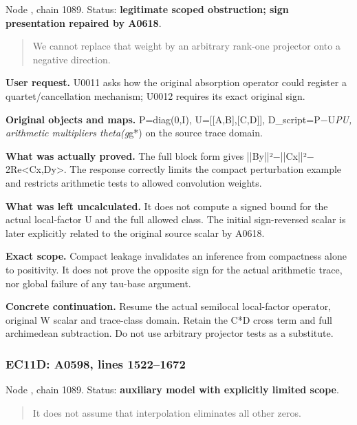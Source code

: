 \documentclass[10pt,a4paper,oneside]{report}
\begin{document}
Node \protect{}, chain 1089.
Status: \textbf{legitimate scoped obstruction; sign presentation
repaired by A0618}.

\begin{quote}
We cannot replace that weight by an arbitrary rank-one projector onto a
negative direction.
\end{quote}

\textbf{User request.} U0011 asks how the original absorption operator
could register a quartet/cancellation mechanism; U0012 requires its
exact original sign.

\textbf{Original objects and maps.} P=diag(0,I),
U={[}{[}A,B{]},{[}C,D{]}{]},
D\_script=P\allowbreak{}\ensuremath{−}\allowbreak{}U\emph{PU, arithmetic
multipliers theta(g}g*) on the source trace domain.

\textbf{What was actually proved.} The full block form gives
||By||²\allowbreak{}\ensuremath{−}\allowbreak{}||Cx||²\allowbreak{}\ensuremath{−}\allowbreak{}2Re<Cx,Dy>.
The response correctly limits the compact perturbation example and
restricts arithmetic tests to allowed convolution weights.

\textbf{What was left uncalculated.} It does not compute a signed bound
for the actual local-factor U and the full allowed class. The initial
sign-reversed scalar is later explicitly related to the original source
scalar by A0618.

\textbf{Exact scope.} Compact leakage invalidates an inference from
compactness alone to positivity. It does not prove the opposite sign for
the actual arithmetic trace, nor global failure of any tau-base
argument.

\textbf{Concrete continuation.} Resume the actual semilocal local-factor
operator, original W scalar and trace-class domain. Retain the C*D cross
term and full archimedean subtraction. Do not use arbitrary projector
tests as a substitute.

\subsubsection{EC11D: A0598, lines
1522--1672}\label{ec11d-a0598-lines-15221672}

Node \protect{}, chain 1089.
Status: \textbf{auxiliary model with explicitly limited scope}.

\begin{quote}
It does not assume that interpolation eliminates all other zeros.
\end{quote}
\end{document}

